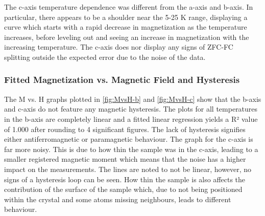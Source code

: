     \noindent The c-axis temperature dependence was different from the a-axis and b-axis. In particular, there appears to be a shoulder near the 5-25 K range, 
    displaying a curve which starts with a rapid decrease in magnetization as the temperature increases, before leveling out and seeing an increase in 
    magnetization with the increasing temperature. The c-axis does nor display any signs of ZFC-FC splitting outside the expected error due to the noise 
    of the data.
    \subsubsection{Fitted Magnetization vs. Magnetic Field and Hysteresis}
    The M vs. H graphs plotted in \autoref{fig:MvsH-b} and \autoref{fig:MvsH-c} show that the b-axis and c-axis do not feature any magnetic hysteresis. 
    The plots for all temperatures in the b-axis are completely linear and a fitted linear regression yields a R² value of 1.000 after rounding to 4 
    significant figures. The lack of hysteresis signifies either antiferromagnetic or paramagnetic behaviour. The graph for the c-axis is far more noisy.
     This is due to how thin the sample was in the c-axis, leading to a smaller registered magnetic moment which means that the noise has a higher impact
      on the measurements. The lines are noted to not be linear, however, no signs of a hysteresis loop can be seen. How thin the sample is also affects 
      the contribution of the surface of the sample which, due to not being positioned within the crystal and some atoms missing neighbours, leads to 
      different behaviour. 